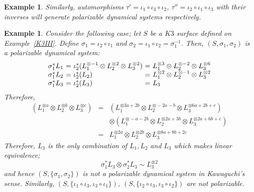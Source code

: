 \documentclass[11pt,letterpaper]{amsart}
\newtheorem{ex}[thm]{Example}
\begin{document}
\begin{ex}
        Similarly, automorphisms $\tau' = \iota_1\circ \iota_3 \circ \iota_2$, $\tau''= \iota_2 \circ \iota_1 \circ \iota_3$ with their inverses will generate polarizable dynamical systems respectively.
    \end{ex}

     \begin{ex}\label{ce}
    Consider the following case; let $S$ be a $K3$ surface defined on Example~\ref{K3III}. Define $\sigma_1 = \iota_2 \circ \iota_1$ and $\sigma_2 = \iota_1 \circ \iota_2 = \sigma_1^{-1}$. Then,
        $(S, \sigma_1, \sigma_2)$ is a polarizable dynamical system:
        \[
        \begin{array}{c@{~=~}l@{~=~}l}
        \sigma_1^*L_1 & \iota_2^* (L_1^{\otimes -1} \otimes  L_2^{\otimes 2} \otimes L_3^{\otimes 2}) &
        L_1^{\otimes 3} \otimes  L_2^{\otimes -2} \otimes L_3^{\otimes 6} \\
        \sigma_1^*L_2 & \iota_2^* (L_2) &  L_1^{\otimes 2} \otimes  L_2^{\otimes -1} \otimes L_3^{\otimes 2} \\
        \sigma_1^*L_3 & \iota_2^* (L_3) & L_3
        \end{array}
        \]
        Therefore,
        \begin{eqnarray*}
        [\sigma_1^*\otimes \sigma_2^*](L_1^{\otimes a} \otimes  L_2^{\otimes b} \otimes L_3^{\otimes c})
         &=& (L_1^{\otimes 3a+2b} \otimes  L_2^{\otimes -2a-b} \otimes L_3^{\otimes 6a+2b+c}) \\
         & & \otimes (L_1^{\otimes -a-2b} \otimes  L_2^{\otimes 2a+3b } \otimes L_3^{\otimes 2a+6b+c}) \\
         &=&          L_1^{\otimes 2a} \otimes  L_2^{\otimes 2b} \otimes L_3^{\otimes 8a+8b+2c}
        \end{eqnarray*}
        Therefore, $L_3$ is the only combination of $L_1, L_2$ and $L_3$ which makes linear equivalence;
        \[
        \sigma_1^*L_3 \otimes \sigma_2^* L_3 \sim L_3^{\otimes 2}
        \]
        and hence $(S, \{\sigma_1, \sigma_2\})$ is not a polarizable dynamical system in Kawaguchi's sense.
        Similarly,
        $(S, \{\iota_1\circ \iota_3, \iota_3\circ \iota_1\})$,  $(S, \{\iota_2\circ \iota_3, \iota_3\circ \iota_2\})$
        are not polarizable.
    \end{ex}
\end{document}
